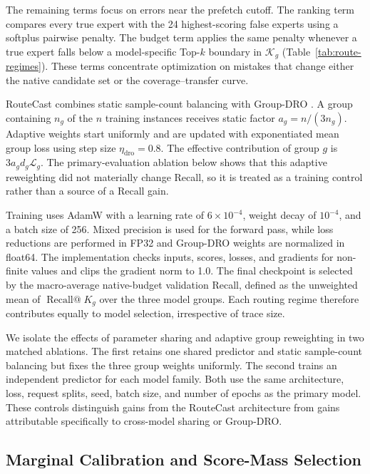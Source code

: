 \documentclass[conference]{IEEEtran}
\begin{document}
The remaining terms focus on errors near the prefetch cutoff. The ranking term
compares every true expert with the 24 highest-scoring false experts using a
softplus pairwise penalty. The budget term applies the same penalty whenever a
true expert falls below a model-specific Top-\(k\) boundary in
\(\mathcal{K}_g\) (Table~\ref{tab:route-regimes}). These terms concentrate
optimization on mistakes that change either the native candidate set or the
coverage--transfer curve.

RouteCast combines static sample-count balancing with Group-DRO
\cite{sagawa2020}. A group containing \(n_g\) of the \(n\) training instances
receives static factor \(a_g=n/(3n_g)\). Adaptive weights start uniformly and
are updated with exponentiated mean group loss using step size
\(\eta_{\mathrm{dro}}=0.8\). The effective contribution of group \(g\) is
\(3a_gd_g\mathcal{L}_g\). The primary-evaluation ablation below shows that this
adaptive reweighting did not materially change Recall, so it is treated as a
training control rather than a source of a Recall gain.

Training uses AdamW \cite{loshchilov2019} with a learning rate of \(6\times10^{-4}\), weight decay
of \(10^{-4}\), and a batch size of 256. Mixed precision is used for the
forward pass, while loss reductions are performed in FP32 and Group-DRO
weights are normalized in float64. The implementation checks inputs, scores,
losses, and gradients for non-finite values and clips the gradient norm to
1.0. The final checkpoint is selected by the macro-average native-budget
validation Recall, defined as the unweighted mean of
\(\operatorname{Recall@}K_g\) over the three model groups. Each routing regime
therefore contributes equally to model selection, irrespective of trace size.

We isolate the effects of parameter sharing and adaptive group reweighting in
two matched ablations. The first retains one shared predictor and static
sample-count balancing but fixes the three group weights uniformly. The second
trains an independent predictor for each model family. Both use the same
architecture, loss, request splits, seed, batch size, and number of epochs as
the primary model. These controls distinguish gains from the RouteCast
architecture from gains attributable specifically to cross-model sharing or
Group-DRO.
\subsection{Marginal Calibration and Score-Mass Selection}
\end{document}
